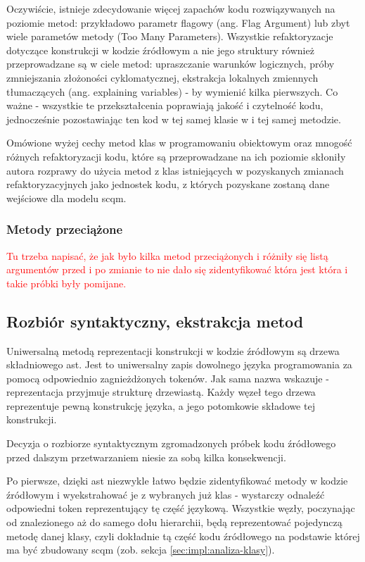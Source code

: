 \documentclass[12pt]{report}
\begin{document}
Oczywiście, istnieje zdecydowanie więcej zapachów kodu rozwiązywanych na poziomie metod: przykładowo parametr flagowy (ang. Flag Argument) lub zbyt wiele parametów metody (Too Many Parameters). Wszystkie refaktoryzacje dotyczące konstrukcji w kodzie źródłowym a nie jego struktury również przeprowadzane są w ciele metod: upraszczanie warunków logicznych, próby zmniejszania złożoności cyklomatycznej, ekstrakcja lokalnych zmiennych tłumaczących (ang. explaining variables) - by wymienić kilka pierwszych. Co ważne - wszystkie te przekształcenia poprawiają jakość i czytelność kodu, jednocześnie pozostawiając ten kod w tej samej klasie w i tej samej metodzie.

Omówione wyżej cechy metod klas w programowaniu obiektowym oraz mnogość różnych refaktoryzacji kodu, które są przeprowadzane na ich poziomie skłoniły autora rozprawy do użycia metod z klas istniejących w pozyskanych zmianach refaktoryzacyjnych jako jednostek kodu, z których pozyskane zostaną dane wejściowe dla modelu \gls{scqm}.

\subsubsection{Metody przeciążone}

\textcolor{red}{Tu trzeba napisać, że jak było kilka metod przeciążonych i różniły się listą argumentów przed i po zmianie to nie dało się zidentyfikować która jest która i takie próbki były pomijane.}

\subsection{Rozbiór syntaktyczny, ekstrakcja metod}
\label{sec:impl:ast}
Uniwersalną metodą reprezentacji konstrukcji w kodzie źródłowym są drzewa składniowego \gls{ast}. Jest to uniwersalny zapis dowolnego języka programowania za pomocą odpowiednio zagnieżdżonych tokenów. Jak sama nazwa wskazuje - reprezentacja przyjmuje strukturę drzewiastą. Każdy węzeł tego drzewa reprezentuje pewną konstrukcję języka, a jego potomkowie składowe tej konstrukcji.

Decyzja o rozbiorze syntaktycznym zgromadzonych próbek kodu źródłowego przed dalszym przetwarzaniem niesie za sobą kilka konsekwencji.

Po pierwsze, dzięki \gls{ast} niezwykle łatwo będzie zidentyfikować metody w kodzie źródłowym i wyekstrahować je z wybranych już klas - wystarczy odnaleźć odpowiedni token reprezentujący tę część językową. Wszystkie węzły, poczynając od znalezionego aż do samego dołu hierarchii, będą reprezentować pojedynczą metodę danej klasy, czyli dokładnie tą część kodu źródłowego na podstawie której ma być zbudowany \gls{scqm} (zob. sekcja \ref{sec:impl:analiza-klasy}).
\end{document}
